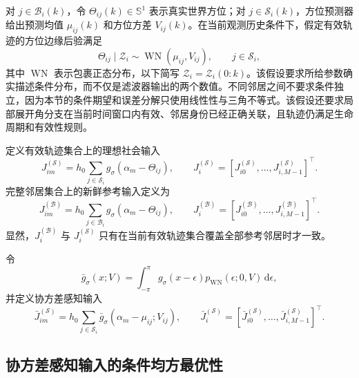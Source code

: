 \documentclass[UTF8,fontset=windows,11pt]{ctexart}
\newcommand{\Sone}{\mathbb S^1}
\begin{document}
对 $j\in\mathcal B_i(k)$，令 $\Theta_{ij}(k)\in\Sone$ 表示真实世界方位；对 $j\in\mathcal S_i(k)$，方位预测器给出预测均值 $\mu_{ij}(k)$ 和方位方差 $V_{ij}(k)$。在当前观测历史条件下，假定有效轨迹的方位边缘后验满足
\begin{equation}
 \Theta_{ij}\mid\mathcal Z_i\sim\operatorname{WN}(\mu_{ij},V_{ij}),
 \qquad j\in\mathcal S_i,
 \label{eq:v2_wn_assumption}
\end{equation}
其中 $\operatorname{WN}$ 表示包裹正态分布，以下简写 $\mathcal Z_i=\mathcal Z_i(0:k)$。该假设要求所给参数确实描述条件分布，而不仅是滤波器输出的两个数值。不同邻居之间不要求条件独立，因为本节的条件期望和误差分解只使用线性性与三角不等式。该假设还要求局部展开角分支在当前时间窗口内有效、邻居身份已经正确关联，且轨迹仍满足生命周期和有效性规则。

定义有效轨迹集合上的理想社会输入
\begin{equation}
 J_{im}^{(\mathcal S)}=h_0\sum_{j\in\mathcal S_i}g_\sigma(\alpha_m-\Theta_{ij}),
 \qquad
 J_i^{(\mathcal S)}=[J_{i0}^{(\mathcal S)},\ldots,J_{i,M-1}^{(\mathcal S)}]^{\top}.
 \label{eq:v2_tracked_ideal}
\end{equation}
完整邻居集合上的新鲜参考输入定义为
\begin{equation}
 J_{im}^{(\mathcal B)}=h_0\sum_{j\in\mathcal B_i}g_\sigma(\alpha_m-\Theta_{ij}),
 \qquad
 J_i^{(\mathcal B)}=[J_{i0}^{(\mathcal B)},\ldots,J_{i,M-1}^{(\mathcal B)}]^{\top}.
 \label{eq:v2_full_ideal}
\end{equation}
显然，$J_i^{(\mathcal B)}$ 与 $J_i^{(\mathcal S)}$ 只有在当前有效轨迹集合覆盖全部参考邻居时才一致。

令
\begin{equation}
 \bar g_\sigma(x;V)=\int_{-\pi}^{\pi}g_\sigma(x-\epsilon)
 p_{\operatorname{WN}}(\epsilon;0,V)\,\mathrm d\epsilon,
 \label{eq:v2_conv_kernel}
\end{equation}
并定义协方差感知输入
\begin{equation}
 \bar J_{im}^{(\mathcal S)}=h_0\sum_{j\in\mathcal S_i}
 \bar g_\sigma(\alpha_m-\mu_{ij};V_{ij}),
 \qquad
 \bar J_i^{(\mathcal S)}=[\bar J_{i0}^{(\mathcal S)},\ldots,\bar J_{i,M-1}^{(\mathcal S)}]^{\top}.
 \label{eq:v2_unc_input}
\end{equation}

\subsection{协方差感知输入的条件均方最优性}
\end{document}
